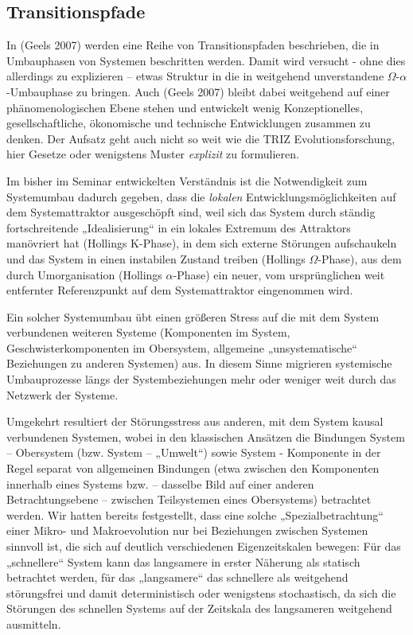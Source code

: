 \documentclass[11pt,a4paper]{article}
\begin{document}
\subsection{Transitionspfade}

In (Geels 2007) werden eine Reihe von Transitionspfaden beschrieben, die in
Umbauphasen von Systemen beschritten werden. Damit wird versucht - ohne dies
allerdings zu explizieren -- etwas Struktur in die in \cite{Holling2000}
weitgehend unverstandene $\Omega$-$\alpha$-Umbauphase zu bringen. Auch (Geels 2007)
bleibt dabei weitgehend auf einer phänomenologischen Ebene stehen und
entwickelt wenig Konzeptionelles, gesellschaftliche, ökonomische und
technische Entwicklungen zusammen zu denken. Der Aufsatz geht auch nicht so
weit wie die TRIZ Evolutionsforschung, hier Gesetze oder wenigstens Muster
\emph{explizit} zu formulieren.

Im bisher im Seminar entwickelten Verständnis ist die Notwendigkeit zum
Systemumbau dadurch gegeben, dass die \emph{lokalen} Entwicklungsmöglichkeiten
auf dem Systemattraktor ausgeschöpft sind, weil sich das System durch ständig
fortschreitende „Idealisierung“ in ein lokales Extremum des Attraktors
manövriert hat (Hollings K-Phase), in dem sich externe Störungen aufschaukeln
und das System in einen instabilen Zustand treiben (Hollings $\Omega$-Phase), aus
dem durch Umorganisation (Hollings $\alpha$-Phase) ein neuer, vom ursprünglichen
weit entfernter Referenzpunkt auf dem Systemattraktor eingenommen wird.

Ein solcher Systemumbau übt einen größeren Stress auf die mit dem System
verbundenen weiteren Systeme (Komponenten im System, Geschwisterkomponenten im
Obersystem, allgemeine „unsystematische“ Beziehungen zu anderen Systemen)
aus. In diesem Sinne migrieren systemische Umbauprozesse längs der
Systembeziehungen mehr oder weniger weit durch das Netzwerk der Systeme.

Umgekehrt resultiert der Störungsstress aus anderen, mit dem System kausal
verbundenen Systemen, wobei in den klassischen Ansätzen die Bindungen System
-- Obersystem (bzw. System -- „Umwelt“) sowie System - Komponente in der Regel
separat von allgemeinen Bindungen (etwa zwischen den Komponenten innerhalb
eines Systems bzw. -- dasselbe Bild auf einer anderen Betrachtungsebene --
zwischen Teilsystemen eines Obersystems) betrachtet werden. Wir hatten bereits
festgestellt, dass eine solche „Spezialbetrachtung“ einer Mikro- und
Makroevolution nur bei Beziehungen zwischen Systemen sinnvoll ist, die sich
auf deutlich verschiedenen Eigenzeitskalen bewegen: Für das „schnellere“
System kann das langsamere in erster Näherung als statisch betrachtet werden,
für das „langsamere“ das schnellere als weitgehend störungsfrei und damit
deterministisch oder wenigstens stochastisch, da sich die Störungen des
schnellen Systems auf der Zeitskala des langsameren weitgehend ausmitteln.
\end{document}

